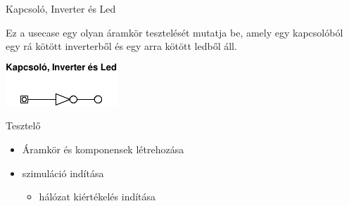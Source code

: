\usecase
{Kapcsoló, Inverter és Led}
{Ez a usecase egy olyan áramkör tesztelését mutatja be, amely egy kapcsolóból egy rá kötött inverterből és egy arra kötött ledből áll.\newline
\begin{center}
\vspace{-15pt}
\includegraphics[scale=1.5]{dw/circuit_test2.pdf}
\vspace{-10pt}
\end{center}}
{Tesztelő}
{\vspace{-15pt}
\begin{itemize}
\setlength{\itemsep}{0cm}%
\setlength{\parskip}{0cm}%
\setlength{\itemindent}{-10pt}%
\item Áramkör és komponensek létrehozása
\item szimuláció indítása
\begin{itemize}
\setlength{\itemsep}{0cm}%
\setlength{\parskip}{0cm}%
\setlength{\itemindent}{-25pt}%
\item hálózat kiértékelés indítása
\begin{itemize}

\end{itemize}
\end{itemize}
\end{itemize}}
